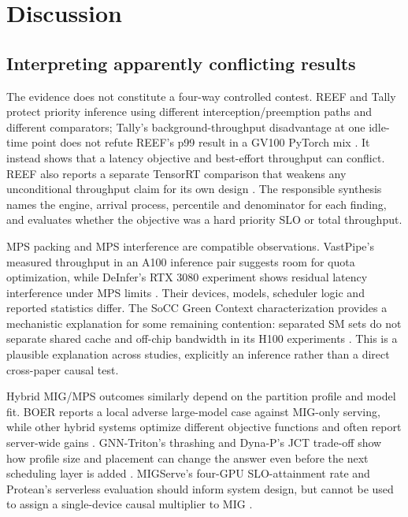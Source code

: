 \section{Discussion}
\subsection{Interpreting apparently conflicting results}
The evidence does not constitute a four-way controlled contest. REEF and Tally protect priority inference using different interception/preemption paths and different comparators; Tally's background-throughput disadvantage at one idle-time point does not refute REEF's p99 result in a GV100 PyTorch mix \cite{reef,tally}. It instead shows that a latency objective and best-effort throughput can conflict. REEF also reports a separate TensorRT comparison that weakens any unconditional throughput claim for its own design \cite{reef}. The responsible synthesis names the engine, arrival process, percentile and denominator for each finding, and evaluates whether the objective was a hard priority SLO or total throughput.

MPS packing and MPS interference are compatible observations. VastPipe's measured throughput in an A100 inference pair suggests room for quota optimization, while DeInfer's RTX 3080 experiment shows residual latency interference under MPS limits \cite{vastpipe,deinfer}. Their devices, models, scheduler logic and reported statistics differ. The SoCC Green Context characterization provides a mechanistic explanation for some remaining contention: separated SM sets do not separate shared cache and off-chip bandwidth in its H100 experiments \cite{interference_deeper}. This is a plausible explanation across studies, explicitly an inference rather than a direct cross-paper causal test.

Hybrid MIG/MPS outcomes similarly depend on the partition profile and model fit. BOER reports a local adverse large-model case against MIG-only serving, while other hybrid systems optimize different objective functions and often report server-wide gains \cite{boer,parva,miger}. GNN-Triton's thrashing and Dyna-P's JCT trade-off show how profile size and placement can change the answer even before the next scheduling layer is added \cite{gnntriton,dynap}. MIGServe's four-GPU SLO-attainment rate and Protean's serverless evaluation should inform system design, but cannot be used to assign a single-device causal multiplier to MIG \cite{migserve,protean}.

